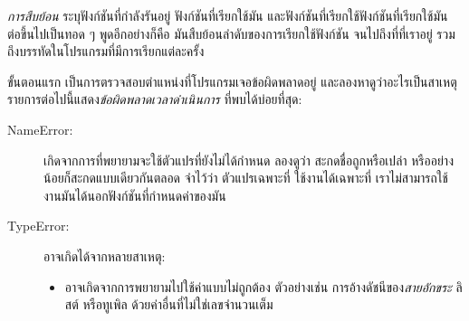 \textit{การสืบย้อน} ระบุฟังก์ชันที่กำลังรันอยู่
ฟังก์ชันที่เรียกใช้มัน และฟังก์ชันที่เรียกใช้ฟังก์ชันที่เรียกใช้มัน ต่อขึ้นไปเป็นทอด ๆ
พูดอีกอย่างก็คือ
มันสืบย้อนลำดับของการเรียกใช้ฟังก์ชัน จนไปถึงที่ที่เราอยู่ รวมถึงบรรทัดในโปรแกรมที่มีการเรียกแต่ละครั้ง


ขั้นตอนแรก เป็นการตรวจสอบตำแหน่งที่โปรแกรมเจอข้อผิดพลาดอยู่
และลองหาดูว่าอะไรเป็นสาเหตุ
รายการต่อไปนี้แสดง\textit{ข้อผิดพลาดเวลาดำเนินการ} ที่พบได้บ่อยที่สุด:

\begin{description}


\item[NameError:]  
เกิดจากการที่พยายามจะใช้ตัวแปรที่ยังไม่ได้กำหนด
ลองดูว่า สะกดชื่อถูกหรือเปล่า หรืออย่างน้อยก็สะกดแบบเดียวกันตลอด
จำไว้ว่า ตัวแปรเฉพาะที่ ใช้งานได้เฉพาะที่
เราไม่สามารถใช้งานมันได้นอกฟังก์ชันที่กำหนดค่าของมัน


\item[TypeError:] อาจเกิดได้จากหลายสาเหตุ:


\begin{itemize}


\item อาจเกิดจากการพยายามไปใช้ค่าแบบไม่ถูกต้อง
ตัวอย่างเช่น การอ้างดัชนีของ\textit{สายอักขระ}
ลิสต์ หรือทูเพิล ด้วยค่าอื่นที่ไม่ใช่เลขจำนวนเต็ม



\end{itemize}
\end{description}
